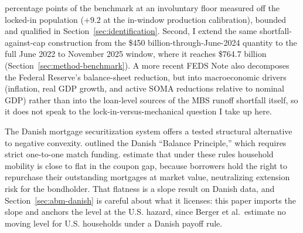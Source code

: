 \documentclass[12pt]{article}
\begin{document}
percentage points of the benchmark at an involuntary floor measured off the locked-in population ($+9.2$ at the in-window production calibration), bounded and qualified in Section~\ref{sec:identification}. Second, I extend the same shortfall-against-cap construction from the \$450 billion-through-June-2024 quantity to the full June 2022 to November 2025 window, where it reaches \$764.7 billion (Section~\ref{sec:method-benchmark}). A more recent \citet{eyal2026} FEDS Note also decomposes the Federal Reserve's balance-sheet reduction, but into macroeconomic drivers (inflation, real GDP growth, and active SOMA reductions relative to nominal GDP) rather than into the loan-level sources of the MBS runoff shortfall itself, so it does not speak to the lock-in-versus-mechanical question I take up here.

The Danish mortgage securitization system offers a tested structural alternative to negative convexity. \citet{berg2018} outlined the Danish ``Balance Principle,'' which requires strict one-to-one match funding. \citet[\S3.3.1]{berger2026} estimate that under these rules household mobility is close to flat in the coupon gap, because borrowers hold the right to repurchase their outstanding mortgages at market value, neutralizing extension risk for the bondholder. That flatness is a slope result on Danish data, and Section~\ref{sec:abm-danish} is careful about what it licenses: this paper imports the slope and anchors the level at the U.S. hazard, since Berger et al.\ estimate no moving level for U.S. households under a Danish payoff rule.
\end{document}
